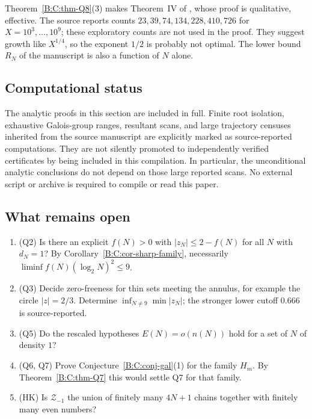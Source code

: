 \documentclass[11pt,a4paper]{article}
\theoremstyle{definition}
\theoremstyle{remark}
\numberwithin{equation}{section}
\begin{document}
Theorem~\ref{B:C:thm-Q8}(3) makes Theorem~IV of \cite{R005}, whose proof is
qualitative, effective.  The source reports counts $23,39,74,134,228,410,726$ for
$X=10^3,\dots,10^9$; these exploratory counts are not used in the proof.  They suggest growth like
$X^{1/4}$, so the exponent $1/2$ is probably not optimal.  The lower bound $R_N$
of the manuscript is also a function of $N$ alone.

\subsection{Computational status}\label{B:C:ssec-comp}
The analytic proofs in this section are included in full. Finite root
isolation, exhaustive Galois-group ranges, resultant scans, and large
trajectory censuses inherited from the source manuscript are explicitly
marked as source-reported computations. They are not silently promoted to
independently verified certificates by being included in this compilation.
In particular, the unconditional analytic conclusions do not depend on those
large reported scans. No external script or archive is required to compile
or read this paper.

\subsection{What remains open}\label{B:C:ssec-open}

\begin{enumerate}
\item (Q2) Is there an explicit $f(N)>0$ with $|z_N|\le2-f(N)$ for all $N$ with
$d_N=1$?  By Corollary~\ref{B:C:cor-sharp-family}, necessarily
$\liminf f(N)(\log_2N)^2\le9$.
\item (Q3) Decide zero-freeness for thin sets meeting the annulus, for example
the circle $|z|=2/3$.  Determine $\inf_{N\ne9}\min|z_N|$; the stronger lower cutoff $0.666$ is source-reported.
\item (Q5) Do the rescaled hypotheses $E(N)=o(n(N))$ hold for a set of $N$ of
density $1$?
\item (Q6, Q7) Prove Conjecture~\ref{B:C:conj-gal}(1) for the family $H_m$.  By Theorem~\ref{B:C:thm-Q7} this would settle Q7 for that family.
\item (HK) Is $\mathcal Z_{-1}$ the union of finitely many $4N+1$ chains together
with finitely many even numbers?
\end{enumerate}


\end{document}
